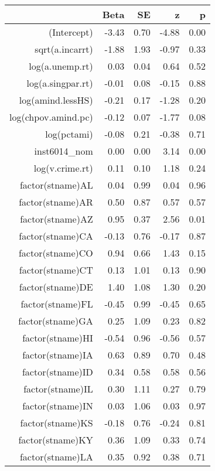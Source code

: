 \begin{table}[ht]
\centering
\begin{tabular}{rrrrr}
  \hline
 & Beta & SE & z & p \\ 
  \hline
(Intercept) & -3.43 & 0.70 & -4.88 & 0.00 \\ 
  sqrt(a.incarrt) & -1.88 & 1.93 & -0.97 & 0.33 \\ 
  log(a.unemp.rt) & 0.03 & 0.04 & 0.64 & 0.52 \\ 
  log(a.singpar.rt) & -0.01 & 0.08 & -0.15 & 0.88 \\ 
  log(amind.lessHS) & -0.21 & 0.17 & -1.28 & 0.20 \\ 
  log(chpov.amind.pc) & -0.12 & 0.07 & -1.77 & 0.08 \\ 
  log(pctami) & -0.08 & 0.21 & -0.38 & 0.71 \\ 
  inst6014\_nom & 0.00 & 0.00 & 3.14 & 0.00 \\ 
  log(v.crime.rt) & 0.11 & 0.10 & 1.18 & 0.24 \\ 
  factor(stname)AL & 0.04 & 0.99 & 0.04 & 0.96 \\ 
  factor(stname)AR & 0.50 & 0.87 & 0.57 & 0.57 \\ 
  factor(stname)AZ & 0.95 & 0.37 & 2.56 & 0.01 \\ 
  factor(stname)CA & -0.13 & 0.76 & -0.17 & 0.87 \\ 
  factor(stname)CO & 0.94 & 0.66 & 1.43 & 0.15 \\ 
  factor(stname)CT & 0.13 & 1.01 & 0.13 & 0.90 \\ 
  factor(stname)DE & 1.40 & 1.08 & 1.30 & 0.20 \\ 
  factor(stname)FL & -0.45 & 0.99 & -0.45 & 0.65 \\ 
  factor(stname)GA & 0.25 & 1.09 & 0.23 & 0.82 \\ 
  factor(stname)HI & -0.54 & 0.96 & -0.56 & 0.57 \\ 
  factor(stname)IA & 0.63 & 0.89 & 0.70 & 0.48 \\ 
  factor(stname)ID & 0.34 & 0.58 & 0.58 & 0.56 \\ 
  factor(stname)IL & 0.30 & 1.11 & 0.27 & 0.79 \\ 
  factor(stname)IN & 0.03 & 1.06 & 0.03 & 0.97 \\ 
  factor(stname)KS & -0.18 & 0.76 & -0.24 & 0.81 \\ 
  factor(stname)KY & 0.36 & 1.09 & 0.33 & 0.74 \\ 
  factor(stname)LA & 0.35 & 0.92 & 0.38 & 0.71 \\ 

\end{tabular}
\end{table}
